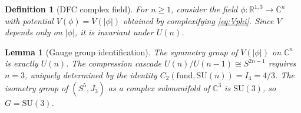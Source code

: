 \documentclass[11pt,a4paper]{article}
\newtheorem{lemma}[theorem]{Lemma}
\newtheorem{definition}[theorem]{Definition}
\begin{document}
\begin{definition}[DFC complex field]\label{def:phi}
For $n \geq 1$, consider the field $\phi: \mathbb{R}^{1,3} \to \mathbb{C}^n$
with potential $V(\phi) = V(|\phi|)$ obtained by complexifying \eqref{eq:Vphi}.
Since $V$ depends only on $|\phi|$, it is invariant under $U(n)$.
\end{definition}

\begin{lemma}[Gauge group identification]\label{lem:G}
The symmetry group of $V(|\phi|)$ on $\mathbb{C}^n$ is exactly $U(n)$.
The compression cascade $U(n)/U(n-1)\cong S^{2n-1}$ requires $n = 3$, uniquely
determined by the identity $C_2(\mathrm{fund},\mathrm{SU}(n)) = I_4 = 4/3$.
The isometry group of $(S^5, J_3)$ as a complex submanifold of $\mathbb{C}^3$
is $\mathrm{SU}(3)$, so $G = \mathrm{SU}(3)$.
\end{lemma}
\end{document}

